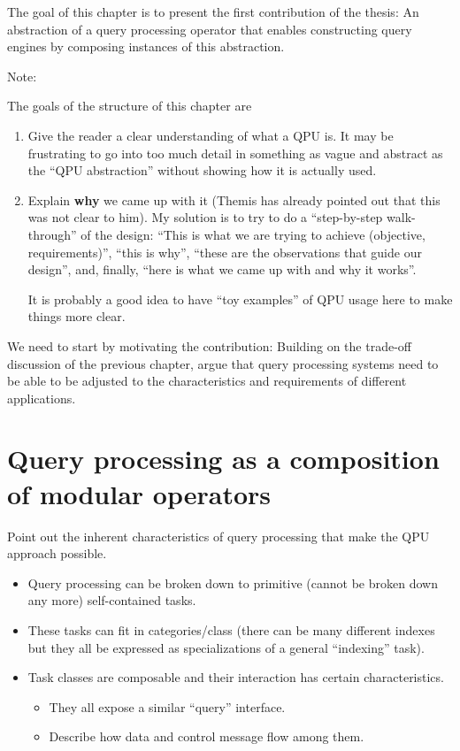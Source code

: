 The goal of this chapter is to present the first contribution of the thesis:
An abstraction of a query processing operator that enables constructing query
engines by composing instances of this abstraction.

\begin{tcolorbox}
Note:

The goals of the structure of this chapter are
\begin{enumerate}
  \item Give the reader a clear understanding of what a QPU is.
  It may be frustrating to go into too much detail in something as vague and
  abstract as the ``QPU abstraction'' without showing how it is actually used.
  \item Explain \textbf{why} we came up with it (Themis has already pointed out
  that this was not clear to him).
  My solution is to try to do a ``step-by-step walk-through'' of the design:
  ``This is what we are trying to achieve (objective, requirements)'', ``this
  is why'', ``these are the observations that guide our design'', and, finally,
  ``here is what we came up with and why it works''.

  It is probably a good idea to have ``toy examples'' of QPU usage here to make
  things more clear.
\end{enumerate}
\end{tcolorbox}

We need to start by motivating the contribution:
Building on the trade-off discussion of the previous chapter, argue that query
processing systems need to be able to be adjusted to the characteristics and
requirements of different applications.

\section{Query processing as a composition of modular operators}
Point out the inherent characteristics of query processing that make the QPU
approach possible.
\begin{itemize}
  \item Query processing can be broken down to primitive (cannot be broken down
  any more) self-contained tasks.
  \item These tasks can fit in categories/class (there can be many
  different indexes but they all be expressed as specializations of a general
  ``indexing'' task).
  \item Task classes are composable and their interaction has certain
  characteristics.
  \begin{itemize}
    \item They all expose a similar ``query'' interface.
    \item Describe how data and control message flow among them.
  \end{itemize}
\end{itemize}


